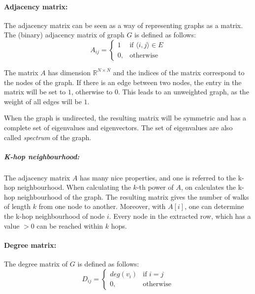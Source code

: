 \paragraph{Adjacency matrix:}
The adjacency matrix can be seen as a way of representing graphs as a matrix.
The (binary) adjacency matrix of graph $G$ is defined as follows:
\begin{equation}
    \label{eg:AdjacencyMatrix}
    A_{ij} =    
    \begin{cases}
        1  & \text{if } \langle i , j \rangle \in E \\
        0, & \text{otherwise}
    \end{cases}
\end{equation}

The matrix $A$ has dimension $\mathbb{R}^{N \times N}$ and the indices of the matrix correspond to the nodes of the graph.
If there is an edge between two nodes, the entry in the matrix will be set to $1$, otherwise to $0$.
This leads to an unweighted graph, as the weight of all edges will be $1$. 

When the graph is undirected, the resulting matrix will be symmetric and has a complete set of eigenvalues
and eigenvectors. The set of eigenvalues are also called \textit{spectrum} of the graph.

\subparagraph{K-hop neighbourhood:}
\label{sec:K-hop neighbourhood}
The adjacency matrix $A$ has many nice properties, and one is referred to the k-hop neighbourhood. 
When calculating the $k$-th power of $A$, on calculates the k-hop neighbourhood of the graph.
The resulting matrix gives the number of walks of length $k$ from one node to another.
Moreover, with $A[i]$, one can determine the k-hop neighbourhood of node $i$. 
Every node in the extracted row, which has a value $> 0$ can be reached within $k$ hops.

\paragraph{Degree matrix:}
The degree matrix of $G$ is defined as follows:
\begin{equation}
    D_{ij} =    
    \begin{cases}
        deg(v_i)  & \text{if } i = j \\
        0, & \text{otherwise}
    \end{cases}
\end{equation}

